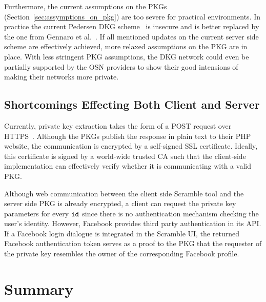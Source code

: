 Furthermore, the current assumptions on the PKGs (Section~\ref{sec:assymptions_on_pkg}) are too severe for practical environments. In practice the current Pedersen DKG scheme~\cite{art:Pedersen91a} is insecure and is better replaced by the one from Gennaro et al.~\cite{art:GennaroJKR07}. If all mentioned updates on the current server side scheme are effectively achieved, more relaxed assumptions on the PKG are in place. With less stringent PKG assumptions, the DKG network could even be partially supported by the OSN providers to show their good intensions of making their networks more private.

\subsection{Shortcomings Effecting Both Client and Server}
Currently, private key extraction takes the form of a POST request over HTTPS~\cite{rfc2818}. Although the PKGs publish the response in plain text to their PHP website, the communication is encrypted by a self-signed SSL certificate. Ideally, this certificate is signed by a world-wide trusted CA such that the client-side implementation can effectively verify whether it is communicating with a valid PKG.

Although web communication between the client side Scramble tool and the server side PKG is already encrypted, a client can request the private key parameters for every $\mathtt{id}_{}$ since there is no authentication mechanism checking the user's identity. However, Facebook provides third party authentication in its API. If a Facebook login dialogue is integrated in the Scramble UI, the returned Facebook authentication token serves as a proof to the PKG that the requester of the private key resembles the owner of the corresponding Facebook profile.

\section{Summary}

